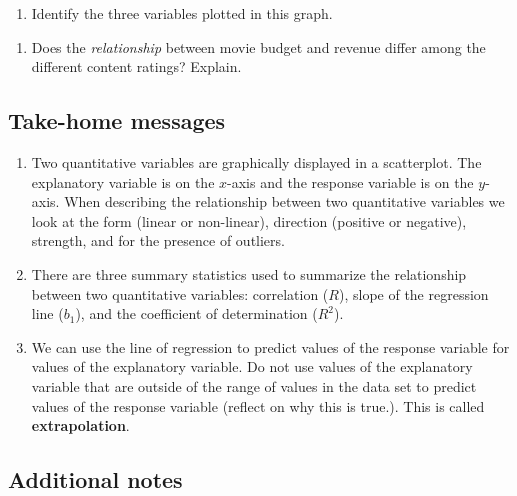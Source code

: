 \documentclass[
]{report}
\providecommand{\tightlist}{%
  \setlength{\itemsep}{0pt}\setlength{\parskip}{0pt}}
\begin{document}
\begin{enumerate}
\def\labelenumi{\arabic{enumi}.}
\setcounter{enumi}{10}
\tightlist
\item
  Identify the three variables plotted in this graph.
\end{enumerate}

\vspace{0.5in}

\begin{enumerate}
\def\labelenumi{\arabic{enumi}.}
\setcounter{enumi}{11}
\tightlist
\item
  Does the \emph{relationship} between movie budget and revenue differ among the different content ratings? Explain.
\end{enumerate}

\vspace{0.8in}
\newpage

\hypertarget{take-home-messages-6}{%
\subsection{Take-home messages}\label{take-home-messages-6}}

\begin{enumerate}
\def\labelenumi{\arabic{enumi}.}
\item
  Two quantitative variables are graphically displayed in a scatterplot. The explanatory variable is on the \(x\)-axis and the response variable is on the \(y\)-axis. When describing the relationship between two quantitative variables we look at the form (linear or non-linear), direction (positive or negative), strength, and for the presence of outliers.
\item
  There are three summary statistics used to summarize the relationship between two quantitative variables: correlation (\(R\)), slope of the regression line (\(b_1\)), and the coefficient of determination (\(R^2\)).
\item
  We can use the line of regression to predict values of the response variable for values of the explanatory variable. Do not use values of the explanatory variable that are outside of the range of values in the data set to predict values of the response variable (reflect on why this is true.). This is called \textbf{extrapolation}.
\end{enumerate}

\hypertarget{additional-notes-5}{%
\subsection{Additional notes}\label{additional-notes-5}}
\end{document}

